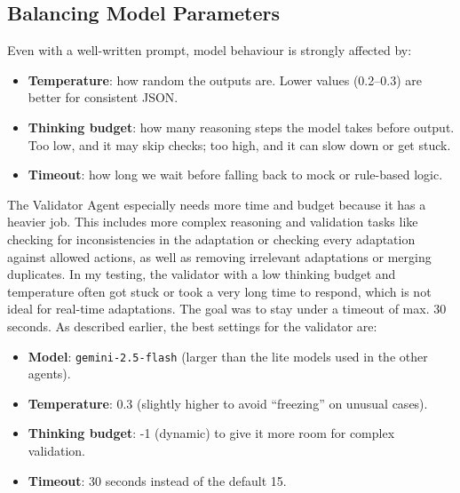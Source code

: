 \documentclass[openany]{book}
\begin{document}
\subsection{Balancing Model Parameters}
Even with a well-written prompt, model behaviour is strongly affected by:
\begin{itemize}
    \item \textbf{Temperature}: how random the outputs are. Lower values (0.2–0.3) are better for consistent JSON.
    \item \textbf{Thinking budget}: how many reasoning steps the model takes before output. Too low, and it may skip checks; too high, and it can slow down or get stuck.
    \item \textbf{Timeout}: how long we wait before falling back to mock or rule-based logic.
\end{itemize}
The Validator Agent especially needs more time and budget because it has a heavier job. This includes more complex reasoning and validation tasks like checking for inconsistencies in the adaptation or checking every adaptation against allowed actions, as well as removing irrelevant adaptations or merging duplicates.
In my testing, the validator with a low thinking budget and temperature often got stuck or took a very long time to respond, which is not ideal for real-time adaptations. The goal was to stay under a timeout of max. 30 seconds.
As described earlier, the best settings for the validator are:
\begin{itemize}
    \item \textbf{Model}: \texttt{gemini-2.5-flash} (larger than the lite models used in the other agents).
    \item \textbf{Temperature}: 0.3 (slightly higher to avoid “freezing” on unusual cases).
    \item \textbf{Thinking budget}: -1 (dynamic) to give it more room for complex validation.
    \item \textbf{Timeout}: 30 seconds instead of the default 15.
\end{itemize}
\end{document}
